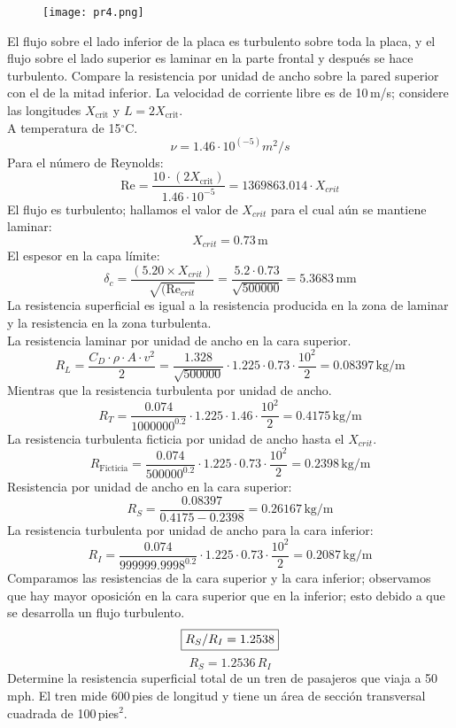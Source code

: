 \documentclass[a4paper,12pt]{exam}
\begin{document}
\begin{questions}
\begin{figure}[H]
\centering
\texttt{[image: pr4.png]}
\end{figure}
El flujo sobre el lado inferior de la placa es turbulento sobre toda la placa, y el flujo sobre el lado superior es laminar en la parte frontal y después se hace turbulento. Compare la resistencia por unidad de ancho sobre la pared superior con el de la mitad inferior. La velocidad de corriente libre es de 10\,m/s; considere las longitudes $X_{\mathrm{crit}}$ y $L = 2 X_{\mathrm{crit}}$.\\
A temperatura de 15$^{\circ}$C.
$$
\nu = 1.46\cdot 10^(-5) m^{2}/s
$$
Para el número de Reynolds:
$$
\mathrm{Re} = \frac{10\cdot (2X_{\mathrm{crit}})}{1.46\cdot 10^{-5}}=1369863.014\cdot X_{crit}
$$
El flujo es turbulento; hallamos el valor de $X_{crit}$ para el cual aún se mantiene laminar:
$$
X_{crit} = 0.73\,\mathrm{m}
$$
El espesor en la capa límite:
$$
\delta_{c}=\frac{(5.20\times X_{crit})}{\sqrt{(\mathrm{Re}_{crit}}}=  \frac{5.2\cdot 0.73}{\sqrt{500000}}=5.3683\,\mathrm{mm}
$$
La resistencia superficial es igual a la resistencia producida en la zona de laminar y la resistencia en la zona turbulenta.\\
La resistencia laminar por unidad de ancho en la cara superior.
$$
R_{L}= \frac{C_{D}\cdot \rho\cdot A\cdot v^{2}}{2}= \frac{1.328}{\sqrt{500000}}\cdot 1.225 \cdot 0.73\cdot \frac{10^{2}}{2}= 0.08397\,\mathrm{kg/m}
$$
Mientras que la resistencia turbulenta por unidad de ancho.
$$
R_{T}= \frac{0.074}{1000000^{0.2}}\cdot 1.225 \cdot 1.46 \cdot \frac{10^{2}}{2} = 0.4175\,\mathrm{kg/m}
$$
La resistencia turbulenta ficticia por unidad de ancho hasta el $X_{crit}$.
$$
R_{\mathrm{Ficticia}} = \frac{0.074}{500000^{0.2}}\cdot 1.225 \cdot 0.73 \cdot \frac{10^{2}}{2}= 0.2398\,\mathrm{kg/m}
$$
Resistencia por unidad de ancho en la cara superior:
$$
R_{S} = \frac{0.08397}{0.4175-0.2398}= 0.26167\,\mathrm{kg/m}
$$
La resistencia turbulenta por unidad de ancho para la cara inferior:
$$
R_{I} = \frac{0.074}{999999.9998^{0.2}}\cdot 1.225\cdot 0.73\cdot \frac{10^{2}}{2} = 0.2087\,\mathrm{kg/m}
$$
Comparamos las resistencias de la cara superior y la cara inferior; observamos que hay mayor oposición en la cara superior que en la inferior; esto debido a que se desarrolla un flujo turbulento.
$$
\fbox{$R_{S}/R_{I} = 1.2538$}
$$
$$
R_{S}=1.2536\,R_{I}
$$
\newpage
\question[4] Determine la resistencia superficial total de un tren de pasajeros que viaja a 50\,mph. El tren mide 600\,pies de longitud y tiene un área de sección transversal cuadrada de 100\,pies$^{2}$.\\

\end{questions}
\end{document}
